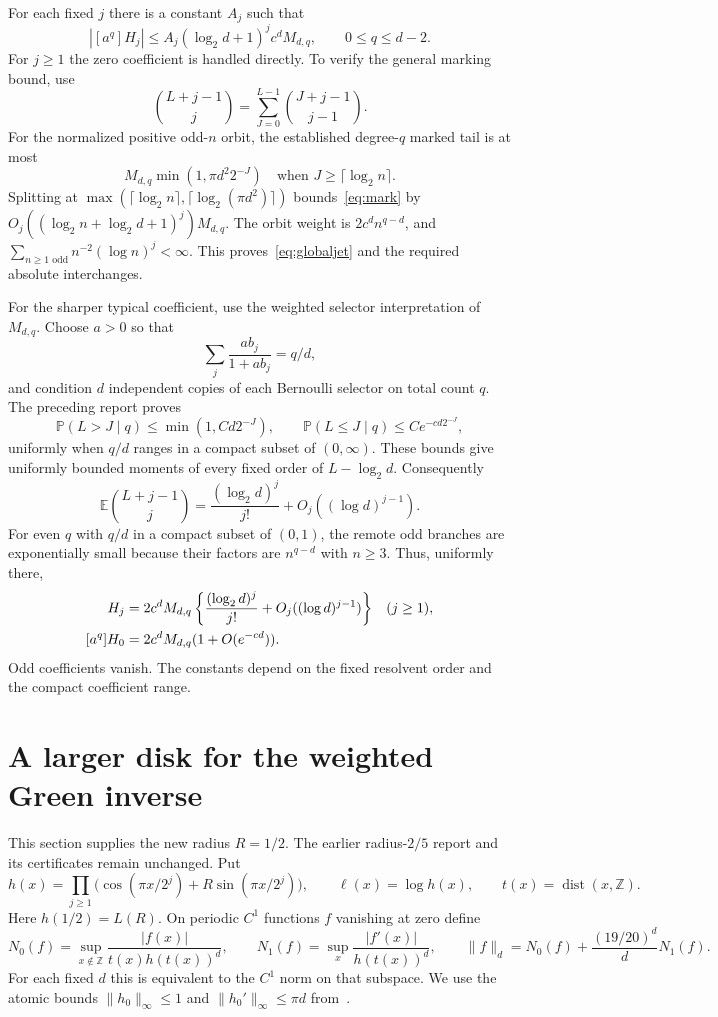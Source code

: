 \documentclass[11pt,a4paper]{article}
\theoremstyle{remark}\newtheorem*{ednote}{Editorial note (ProveIt, 2026-10-01)}
\begin{document}
For each fixed $j$ there is a constant $A_j$ such that
\begin{equation}\label{eq:globaljet}
 |[a^q]H_j|\le A_j(\log_2d+1)^j c^dM_{d,q},
 \qquad 0\le q\le d-2.
\end{equation}
For $j\ge1$ the zero coefficient is handled directly. To verify the general marking bound, use
\[
 \binom{L+j-1}{j}
 =\sum_{J=0}^{L-1}\binom{J+j-1}{j-1}.
\]
For the normalized positive odd-$n$ orbit, the established degree-$q$ marked tail is at most
\[
 M_{d,q}\min(1,\pi d^2 2^{-J})
 \quad\text{when }J\ge\lceil\log_2n\rceil.
\]
Splitting at $\max(\lceil\log_2n\rceil,\lceil\log_2(\pi d^2)\rceil)$ bounds~\eqref{eq:mark} by
$O_j((\log_2n+\log_2d+1)^j)M_{d,q}$. The orbit weight is $2c^dn^{q-d}$, and
$\sum_{n\ge1\text{ odd}}n^{-2}(\log n)^j<\infty$. This proves~\eqref{eq:globaljet} and the required absolute interchanges.

For the sharper typical coefficient, use the weighted selector interpretation of $M_{d,q}$. Choose $a>0$ so that
\[
 \sum_j\frac{ab_j}{1+ab_j}=q/d,
\]
and condition $d$ independent copies of each Bernoulli selector on total count $q$. The preceding report proves
\[
 \mathbb P(L>J\mid q)\le\min(1,Cd2^{-J}),\qquad
 \mathbb P(L\le J\mid q)\le Ce^{-cd2^{-J}},
\]
uniformly when $q/d$ ranges in a compact subset of $(0,\infty)$. These bounds give uniformly bounded moments of every fixed order of $L-\log_2d$. Consequently
\[
 \mathbb E\binom{L+j-1}{j}
 =\frac{(\log_2d)^j}{j!}+O_j((\log d)^{j-1}).
\]
For even $q$ with $q/d$ in a compact subset of $(0,1)$, the remote odd branches are exponentially small because their factors are $n^{q-d}$ with $n\ge3$. Thus, uniformly there,
\begin{align}
 [a^q]H_j&=2c^dM_{d,q}
   \left\{\frac{(\log_2d)^j}{j!}+O_j((\log d)^{j-1})\right\}
   &&(j\ge1),\label{eq:typical}\\
 [a^q]H_0&=2c^dM_{d,q}(1+O(e^{-cd})).\notag
\end{align}
Odd coefficients vanish. The constants depend on the fixed resolvent order and the compact coefficient range.

\section{A larger disk for the weighted Green inverse}
This section supplies the new radius $R=1/2$. The earlier radius-$2/5$ report and its certificates remain unchanged. Put
\[
 h(x)=\prod_{j\ge1}\bigl(\cos(\pi x/2^j)+R\sin(\pi x/2^j)\bigr),
 \qquad \ell(x)=\log h(x),\qquad t(x)=\operatorname{dist}(x,\mathbb Z).
\]
Here $h(1/2)=L(R)$. On periodic $C^1$ functions $f$ vanishing at zero define
\[
 N_0(f)=\sup_{x\notin\mathbb Z}\frac{|f(x)|}{t(x)h(t(x))^d},\qquad
 N_1(f)=\sup_x\frac{|f'(x)|}{h(t(x))^d},\qquad
 \|f\|_d=N_0(f)+\frac{(19/20)^d}{d}N_1(f).
\]
For each fixed $d$ this is equivalent to the $C^1$ norm on that subspace. We use the atomic bounds $\|h_0\|_\infty\le1$ and $\|h_0'\|_\infty\le\pi d$ from~\cite{First}.
\end{document}
